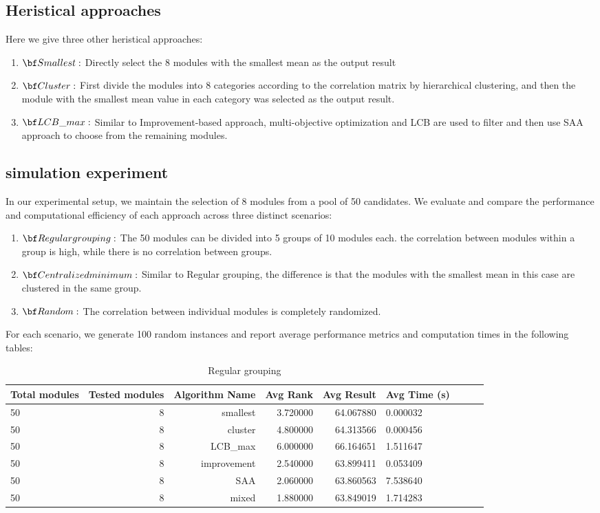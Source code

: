 \documentclass[opre,sglanonrev]{informs4}
\begin{document}
\subsection{Heristical approaches}
Here we give three other heristical approaches:
\begin{enumerate}
	\item ${\bf Smallest:}$ Directly select the 8 modules with the smallest mean as the output result
	\item ${\bf Cluster:}$ First divide the modules into 8 categories according to the correlation matrix by hierarchical clustering, and then the module with the smallest mean value in each category was selected as the output result.
	\item ${\bf LCB\_max:}$ Similar to Improvement-based approach, multi-objective optimization and LCB are used to filter and then use SAA approach to choose from the remaining modules.
\end{enumerate}

\subsection{simulation experiment}
In our experimental setup, we maintain the selection of 8 modules from a pool of 50 candidates. We evaluate and compare the performance and computational efficiency of each approach across three distinct scenarios:
\begin{enumerate}
	\item ${\bf Regular grouping:}$ The 50 modules can be divided into 5 groups of 10 modules each. the correlation between modules within a group is high, while there is no correlation between groups.
	\item ${\bf Centralized minimum:}$ Similar to Regular grouping, the difference is that the modules with the smallest mean in this case are clustered in the same group.
	\item ${\bf Random:}$ The correlation between individual modules is completely randomized.
\end{enumerate}
For each scenario, we generate 100 random instances and report average performance metrics and computation times in the following tables:

\begin{table}[H]
\centering
\caption{Regular grouping}
\begin{tabular}{lrrrrlrrr}
\toprule
Total modules & Tested modules & Algorithm Name & Avg Rank & Avg Result & Avg Time (s) \\
\midrule	
50 & 8 & smallest & 3.720000 & 64.067880 & 0.000032 \\
50 & 8 & cluster & 4.800000 & 64.313566 & 0.000456 \\
50 & 8 & LCB\_max & 6.000000 & 66.164651 & 1.511647 \\
50 & 8 & improvement & 2.540000 & 63.899411 & 0.053409 \\
50 & 8 & SAA & 2.060000 & 63.860563 & 7.538640 \\
50 & 8 & mixed & 1.880000 & 63.849019 & 1.714283 \\
\bottomrule
\end{tabular}
\end{table}
\end{document}
